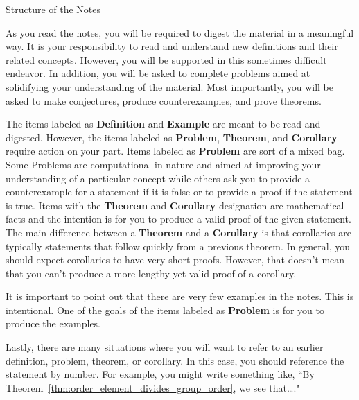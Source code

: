 \begin{section}{Structure of the Notes}

As you read the notes, you will be required to digest the material in a meaningful way.  It is your responsibility to read and understand new definitions and their related concepts.  However, you will be supported in this sometimes difficult endeavor. In addition, you will be asked to complete problems aimed at solidifying your understanding of the material.  Most importantly, you will be asked to make conjectures, produce counterexamples, and prove theorems.

The items labeled as \textbf{Definition} and \textbf{Example} are meant to be read and digested.  However, the items labeled as \textbf{Problem}, \textbf{Theorem}, and \textbf{Corollary} require action on your part.  Items labeled as \textbf{Problem} are sort of a mixed bag. Some Problems are computational in nature and aimed at improving your understanding of a particular concept while others ask you to provide a counterexample for a statement if it is false or to provide a proof if the statement is true. Items with the \textbf{Theorem} and \textbf{Corollary} designation are mathematical facts and the intention is for you to produce a valid proof of the given statement.  The main difference between a \textbf{Theorem} and a \textbf{Corollary} is that corollaries are typically statements that follow quickly from a previous theorem.  In general, you should expect corollaries to have very short proofs.  However, that doesn't mean that you can't produce a more lengthy yet valid proof of a corollary.

It is important to point out that there are very few examples in the notes.  This is intentional.  One of the goals of the items labeled as \textbf{Problem} is for you to produce the examples.

Lastly, there are many situations where you will want to refer to an earlier definition, problem, theorem, or corollary.  In this case, you should reference the statement by number.  For example, you might write something like, ``By Theorem~\ref{thm:order_element_divides_group_order}, we see that\ldots."

\end{section}

